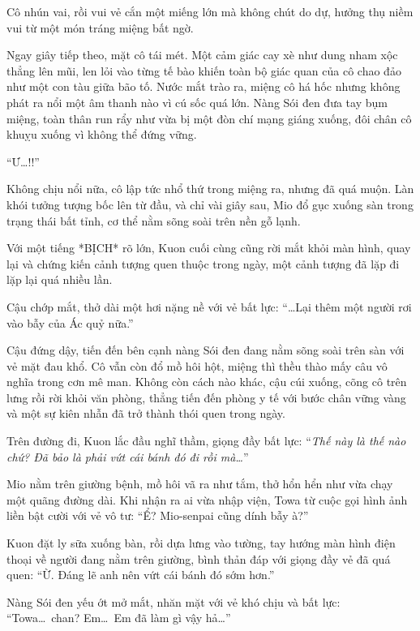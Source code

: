 \documentclass[../main.tex]{subfiles}
\begin{document}
Cô nhún vai, rồi vui vẻ cắn một miếng lớn mà không chút do dự, hưởng thụ niềm vui từ một món tráng miệng bất ngờ.

Ngay giây tiếp theo, mặt cô tái mét. Một cảm giác cay xè như dung nham xộc thẳng lên mũi, len lỏi vào từng tế bào khiến toàn bộ giác quan của cô chao đảo như một con tàu giữa bão tố. Nước mắt trào ra, miệng cô há hốc nhưng không phát ra nổi một âm thanh nào vì cú sốc quá lớn. Nàng Sói đen đưa tay bụm miệng, toàn thân run rẩy như vừa bị một đòn chí mạng giáng xuống, đôi chân cô khuỵu xuống vì không thể đứng vững.

``Ư\dots!!''


Không chịu nổi nữa, cô lập tức nhổ thứ trong miệng ra, nhưng đã quá muộn. Làn khói tưởng tượng bốc lên từ đầu, và chỉ vài giây sau, Mio đổ gục xuống sàn trong trạng thái bất tỉnh, cơ thể nằm sõng soài trên nền gỗ lạnh.

Với một tiếng *BỊCH* rõ lớn, Kuon cuối cùng cũng rời mắt khỏi màn hình, quay lại và chứng kiến cảnh tượng quen thuộc trong ngày, một cảnh tượng đã lặp đi lặp lại quá nhiều lần.

Cậu chớp mắt, thở dài một hơi nặng nề với vẻ bất lực: ``\dots Lại thêm một người rơi vào bẫy của Ác quỷ nữa.''

Cậu đứng dậy, tiến đến bên cạnh nàng Sói đen đang nằm sõng soài trên sàn với vẻ mặt đau khổ. Cô vẫn còn đổ mồ hôi hột, miệng thì thều thào mấy câu vô nghĩa trong cơn mê man. Không còn cách nào khác, cậu cúi xuống, cõng cô trên lưng rồi rời khỏi văn phòng, thẳng tiến đến phòng y tế với bước chân vững vàng và một sự kiên nhẫn đã trở thành thói quen trong ngày.

Trên đường đi, Kuon lắc đầu nghĩ thầm, giọng đầy bất lực: ``\textit{Thế này là thế nào chứ? Đã bảo là phải vứt cái bánh đó đi rồi mà\dots}''

\ct

Mio nằm trên giường bệnh, mồ hôi vã ra như tắm, thở hổn hển như vừa chạy một quãng đường dài. Khi nhận ra ai vừa nhập viện, Towa từ cuộc gọi hình ảnh liền bật cười với vẻ vô tư: ``Ể? Mio-senpai cũng dính bẫy à?''

Kuon đặt ly sữa xuống bàn, rồi dựa lưng vào tường, tay hướng màn hình điện thoại về người đang nằm trên giường, bình thản đáp với giọng đầy vẻ đã quá quen: ``Ừ. Đáng lẽ anh nên vứt cái bánh đó sớm hơn.''

Nàng Sói đen yếu ớt mở mắt, nhăn mặt với vẻ khó chịu và bất lực: ``Towa\dots\ chan? Em\dots\ Em đã làm gì vậy hả\dots''
\end{document}
